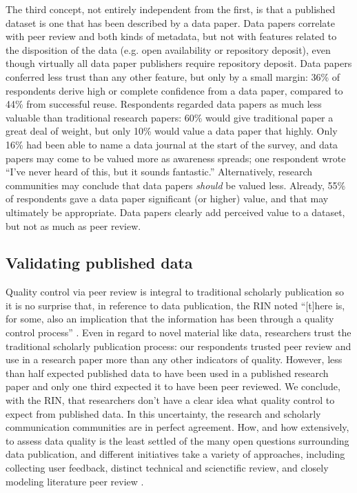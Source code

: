 \documentclass[10pt]{article}
\begin{document}
The third concept, not entirely independent from the first, is that a published dataset is one that has been described by a data paper.
Data papers correlate with peer review and both kinds of metadata, but not with features related to the disposition of the data (e.g. open availability or repository deposit), even though virtually all data paper publishers require repository deposit.
Data papers conferred less trust than any other feature, but only by a small margin: 36\% of respondents derive high or complete confidence from a data paper, compared to 44\% from successful reuse.
Respondents regarded data papers as much less valuable than traditional research papers: 60\% would give traditional paper a great deal of weight, but only 10\% would value a data paper that highly. 
Only 16\% had been able to name a data journal at the start of the survey, and data papers may come to be valued more as awareness spreads; one respondent wrote ``I've never heard of this, but it sounds fantastic.''
Alternatively, research communities may conclude that data papers \textit{should} be valued less.
Already, 55\% of respondents gave a data paper significant (or higher) value, and that may ultimately be appropriate.
Data papers clearly add perceived value to a dataset, but not as much as peer review.
  
 
\subsection*{Validating published data}

Quality control via peer review is integral to traditional scholarly publication so it is no surprise that, in reference to data publication, the RIN noted ``[t]here is, for some, also an implication that the information has been through a quality control process'' \cite{swan_share_2008}.
Even in regard to novel material like data, researchers trust the traditional scholarly publication process: our respondents trusted peer review and use in a research paper more than any other indicators of quality.
However, less than half expected published data to have been used in a published research paper and only one third expected it to have been peer reviewed.
We conclude, with the RIN, that researchers don't have a clear idea what quality control to expect from published data.
In this uncertainty, the research and scholarly communication communities are in perfect agreement.
How, and how extensively, to assess data quality is the least settled of the many open questions surrounding data publication, and different initiatives take a variety of approaches, including collecting user feedback, distinct technical and scienctific review, and closely modeling literature peer review \cite{kratz_data_2014}.
\end{document}

